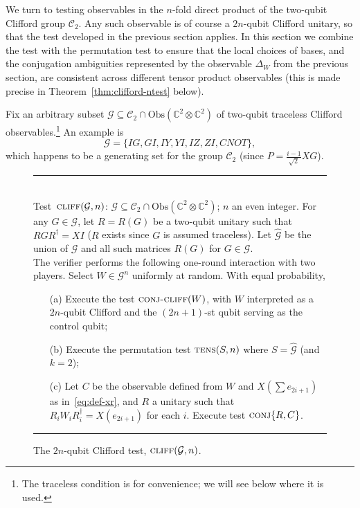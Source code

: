 \documentclass[11pt]{article}
\theoremstyle{remark}
\theoremstyle{definition}
\newcommand{\C}{\ensuremath{\mathbb{C}}}
\newcommand{\setft}[1]{\mathrm{#1}}
\newcommand{\Obs}{\setft{Obs}}
\newcommand{\pbt}{\textsc{pbt}}
\newcommand{\conj}{\textsc{conj}}
\newcommand{\perm}{\textsc{tens}}
\newcommand{\conjc}{\textsc{conj-cliff}}
\newcommand{\cliff}{\textsc{cliff}}
\newcommand{\cliffordgb}{{\mathcal{C}_2}}
\begin{document}
We turn to testing observables in the $n$-fold direct product of the two-qubit Clifford group $\cliffordgb$. Any such observable is of course a $2n$-qubit Clifford unitary, so that the test developed in the previous section applies. In this section we combine the test with the permutation test to ensure that the local choices of bases, and the conjugation ambiguities represented by the observable $\Delta_W$ from the previous section, are consistent across different tensor product observables (this is made precise in Theorem~\ref{thm:clifford-ntest} below). 

 Fix an arbitrary subset $\mathcal{G} \subseteq \cliffordgb \cap \Obs(\C^2\otimes \C^2)$ of two-qubit traceless Clifford observables.\footnote{The traceless condition is for convenience; we will see below where it is used.} An example is 
$$\mathcal{G} = \{IG,GI,IY,YI,IZ,ZI,CNOT\},$$
 which happens to be a generating set for the group $\cliffordgb$ (since $P = \frac{i-1}{\sqrt{2}} XG$).

\begin{figure}[H]
\rule[1ex]{16.5cm}{0.5pt}\\
Test~$\cliff(\mathcal{G},n)$: $\mathcal{G} \subseteq \cliffordgb \cap \Obs(\C^2\otimes \C^2)$; $n$ an even integer.  For any $G\in \mathcal{G}$, let $R=R(G)$ be a two-qubit unitary such that $RGR^\dagger = XI$ ($R$ exists since $G$ is assumed traceless). Let $\hat{\mathcal{G}}$ be the union of $\mathcal{G}$ and all such matrices $R(G)$ for $G\in\mathcal{G}$.\\
The verifier performs the following one-round interaction with two
players. Select $W \in \mathcal{G}^n$ uniformly at random. With equal probability,
\begin{enumerate}
\item[(a)] Execute the test $\conjc(W)$, with $W$ interpreted as a $2n$-qubit Clifford and the $(2n+1)$-st qubit serving as the control qubit; 
\item[(b)] Execute the permutation test $\perm(S,n)$ where $S = \hat{\mathcal{G}}$ (and $k=2$);
\item[(c)] Let $C$ be the observable defined from $W$ and $X(\sum e_{2i+1})$ as in~\eqref{eq:def-xr}, and $R$ a unitary such that $R_i W_i R_i^\dagger = X(e_{2i+1})$ for each $i$.
Execute test $\conj\{R,C\}$.
\end{enumerate}
\rule[2ex]{16.5cm}{0.5pt}\vspace{-1cm}
\caption{The $2n$-qubit Clifford test, $\cliff(\mathcal{G},n)$.}
\label{fig:clifford-test-3}
\end{figure}
\end{document}

